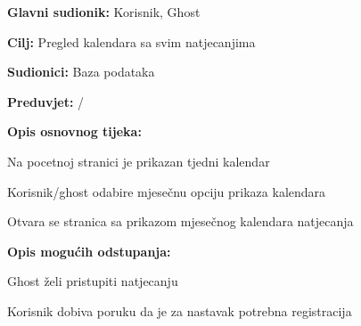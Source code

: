 					
					\noindent {}
					\begin{packed_item}
						
						\item \textbf{Glavni sudionik: }Korisnik, Ghost
						\item  \textbf{Cilj:} Pregled kalendara sa svim natjecanjima 
						\item  \textbf{Sudionici:} Baza podataka
						\item  \textbf{Preduvjet:} /
						\item  \textbf{Opis osnovnog tijeka:}
						
						\item[] \begin{packed_enum}
							
							\item Na pocetnoj stranici je prikazan tjedni kalendar
							\item Korisnik/ghost odabire mjesečnu opciju prikaza kalendara
							\item Otvara se stranica sa prikazom mjesečnog kalendara natjecanja
							
						\end{packed_enum}
						
						\item  \textbf{Opis mogućih odstupanja:}
						
						\item[] \begin{packed_item}
							
							\item[3.a] Ghost želi pristupiti natjecanju
							\item[] \begin{packed_enum}
								
								\item Korisnik dobiva poruku da je za nastavak potrebna registracija 

							\end{packed_enum}

							
						\end{packed_item}
					\end{packed_item}
					

